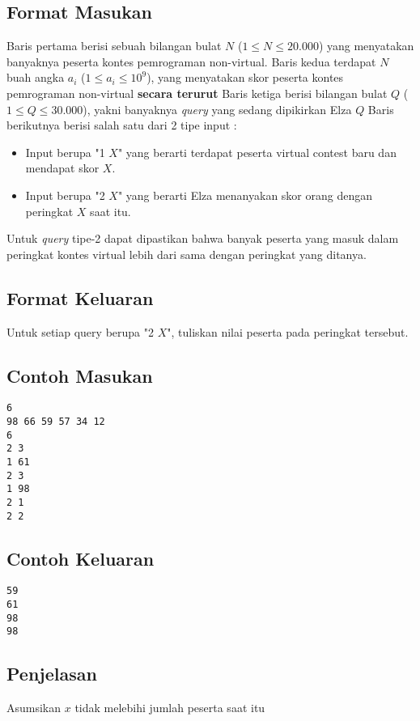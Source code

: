 \documentclass{article}
\begin{document}
\subsection*{Format Masukan}
Baris pertama berisi sebuah bilangan bulat $N$ ($1 \leq N \leq 20.000$) yang menyatakan banyaknya peserta kontes pemrograman non-virtual.
Baris kedua terdapat $N$ buah angka $a_i$ ($1 \leq a_i \leq 10^9$), yang menyatakan skor peserta kontes pemrograman non-virtual \textbf{secara terurut}
Baris ketiga berisi bilangan bulat $Q$ ($1 \leq Q \leq 30.000$), yakni banyaknya \textit{query} yang sedang dipikirkan Elza
$Q$ Baris berikutnya berisi salah satu dari 2 tipe input :
\begin{itemize}
    \setlength{\itemsep}{0pt}
    \item Input berupa "1 $X$" yang berarti terdapat peserta virtual contest baru dan mendapat skor $X$.
    \item Input berupa "2 $X$" yang berarti Elza menanyakan skor orang dengan peringkat $X$ saat itu.
\end{itemize}
Untuk \textit{query} tipe-2 dapat dipastikan bahwa banyak peserta yang masuk dalam peringkat kontes virtual lebih
dari sama dengan peringkat yang ditanya.

\subsection*{Format Keluaran}

Untuk setiap query berupa "2 $X$", tuliskan nilai peserta pada peringkat tersebut.
\\

\begin{multicols}{2}
\subsection*{Contoh Masukan}
\begin{lstlisting}
6
98 66 59 57 34 12
6
2 3
1 61
2 3
1 98
2 1
2 2
\end{lstlisting}
\columnbreak
\subsection*{Contoh Keluaran}
\begin{lstlisting}
59
61
98
98
\end{lstlisting}
\vfill
\null
\end{multicols}

\subsection*{Penjelasan}
Asumsikan $x$ tidak melebihi jumlah peserta saat itu

\pagebreak
\end{document}
